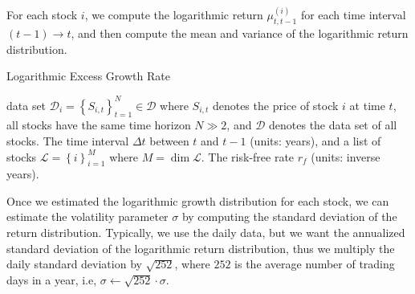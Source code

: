 \documentclass[11pt]{article}
\theoremstyle{definition}
\begin{document}
For each stock $i$, we compute the logarithmic return $\mu^{(i)}_{t,t-1}$ for each time interval $(t-1)\rightarrow{t}$, and then compute the mean and variance of the logarithmic return distribution.
\begin{algorithm}[h]
    \caption{Logarithmic Excess Growth Rate}\label{algo-log-return-distributions-equity}
    \begin{algorithmic}[1]

        \Statex
        \Require data set $\mathcal{D}_{i} = \left\{S_{i,t}\right\}_{t=1}^{N}\in\mathcal{D}$ where $S_{i,t}$ denotes the price of stock $i$ at time $t$, all stocks have the same time horizon $N\gg{2}$, 
		and $\mathcal{D}$ denotes the data set of all stocks.
        \Require The time interval $\Delta{t}$ between $t$ and $t-1$ (units: years), and a list of stocks $\mathcal{L} = \left\{i\right\}_{i=1}^{M}$ where $M = \dim\mathcal{L}$.
        \Require The risk-free rate $r_{f}$ (units: inverse years).
     
        \Statex
            \EndFor
        \EndFor
        \Statex
		\EndProcedure
    \end{algorithmic}
\end{algorithm}
Once we estimated the logarithmic growth distribution for each stock, we can estimate the volatility parameter $\sigma$ by computing the standard deviation of the return distribution.
Typically, we use the daily data, but we want the annualized standard deviation of the logarithmic return distribution, thus we multiply the daily standard deviation by $\sqrt{252}$, where $252$ is the average number of trading days in a year, 
i.e, $\sigma\leftarrow \sqrt{252}\cdot\sigma$.
\end{document}
